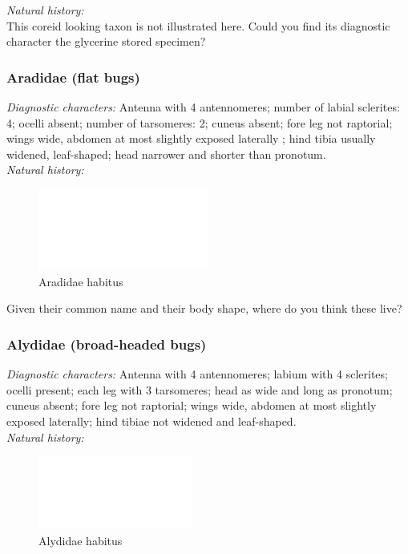 \documentclass[letterpaper, 11pt]{article}
\begin{document}
\noindent{}\textit{Natural history:} \\

\noindent{}This coreid looking taxon is not illustrated here. Could you find its diagnostic character the glycerine stored specimen?\vspace{3cm}

\subsubsection{Aradidae (flat bugs)}
\noindent{}\textit{Diagnostic characters:} Antenna with 4 antennomeres; number of labial sclerites: 4; ocelli absent; number of tarsomeres: 2; cuneus absent; fore leg not raptorial; wings wide, abdomen at most slightly exposed laterally ; hind tibia usually widened, leaf-shaped; head narrower and shorter than pronotum.\\

\noindent{}\textit{Natural history:} \\

\begin{figure}[ht!]
 \centering
 \includegraphics[width=0.5\textwidth]{image14}
 \caption{Aradidae habitus}
 \label{fig:aradid1}
\end{figure}

\noindent{}Given their common name and their body shape, where do you think these live?\vspace{3cm}

\subsubsection{Alydidae (broad-headed bugs)}
\noindent{}\textit{Diagnostic characters:} Antenna with 4 antennomeres; labium with 4 sclerites; ocelli present; each leg with 3 tarsomeres; head as wide and long as pronotum; cuneus absent; fore leg not raptorial; wings wide, abdomen at most slightly exposed laterally; hind tibiae not widened and leaf-shaped.\\

\noindent{}\textit{Natural history:} \\

\begin{figure}[ht!]
 \centering
 \includegraphics[width=0.45\textwidth]{image14}
 \caption{Alydidae habitus}
 \label{fig:alydid1}
\end{figure}
\end{document}
